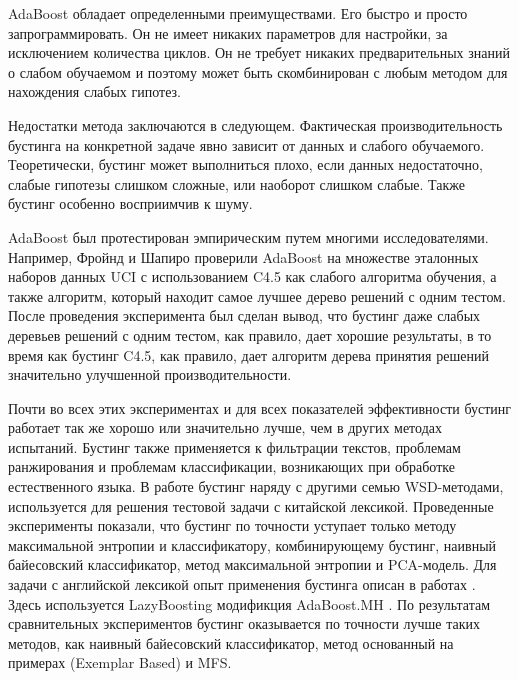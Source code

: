 AdaBoost обладает определенными преимуществами. Его быстро и просто запрограммировать. Он не имеет никаких параметров для настройки, за исключением количества циклов. Он не требует никаких предварительных знаний о слабом обучаемом и поэтому может быть скомбинирован с любым методом для нахождения слабых гипотез.

Недостатки метода заключаются в следующем. Фактическая производительность бустинга на конкретной задаче явно зависит от данных и слабого обучаемого. Теоретически, бустинг может выполниться плохо, если данных недостаточно, слабые гипотезы слишком сложные, или наоборот слишком слабые. Также бустинг особенно восприимчив к шуму.

AdaBoost был протестирован эмпирическим путем многими исследователями. Например, Фройнд и Шапиро проверили AdaBoost на множестве эталонных наборов данных UCI \cite{Merz 1998} с использованием C4.5 \cite{Quinlan 1993} как слабого алгоритма обучения, а также алгоритм, который находит самое лучшее дерево решений с одним тестом. После проведения эксперимента был сделан вывод, что бустинг даже слабых деревьев решений с одним тестом, как правило, дает хорошие результаты, в то время как бустинг C4.5, как правило, дает алгоритм дерева принятия решений значительно улучшенной производительности.

Почти во всех этих экспериментах и для всех показателей эффективности бустинг работает так же хорошо или значительно лучше, чем в других методах испытаний. Бустинг также применяется к фильтрации текстов, проблемам ранжирования и проблемам классификации, возникающих при обработке естественного языка.
В работе \cite{Wu} бустинг наряду с другими семью WSD-методами, используется для решения тестовой задачи с китайской лексикой. Проведенные эксперименты показали, что бустинг по точности уступает только методу максимальной энтропии и классификатору, комбинирующему бустинг, наивный байесовский классификатор, метод максимальной энтропии и PCA-модель.
Для задачи с английской лексикой опыт применения бустинга описан в работах \cite{esc1,esc2}. Здесь используется LazyBoosting модификция AdaBoost.MH \cite{schapire99}.
По результатам сравнительных экспериментов бустинг оказывается по точности лучше таких методов, как наивный байесовский классификатор, метод основанный на примерах (Exemplar Based) и MFS. 
